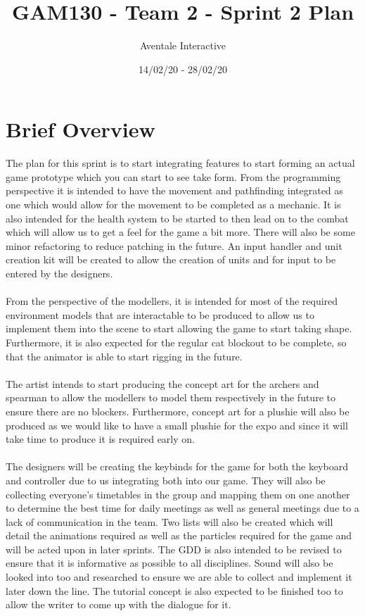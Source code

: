 \documentclass{article}
\title{GAM130 - Team 2 - Sprint 2 Plan}
\author{Aventale Interactive}
\date{14/02/20 - 28/02/20}
\begin{document}
\maketitle

\newpage
\section{Brief Overview}
The plan for this sprint is to start integrating features to start forming an actual game prototype which you can start to see take form. From the programming perspective it is intended to have the movement and pathfinding integrated as one which would allow for the movement to be completed as a mechanic. It is also intended for the health system to be started to then lead on to the combat which will allow us to get a feel for the game a bit more. There will also be some minor refactoring to reduce patching in the future. An input handler and unit creation kit will be created to allow the creation of units and for input to be entered by the designers.
\\\\
From the perspective of the modellers, it is intended for most of the required environment models that are interactable to be produced to allow us to implement them into the scene to start allowing the game to start taking shape. Furthermore, it is also expected for the regular cat blockout to be complete, so that the animator is able to start rigging in the future.
\\\\
The artist intends to start producing the concept art for the archers and spearman to allow the modellers to model them respectively in the future to ensure there are no blockers. Furthermore, concept art for a plushie will also be produced as we would like to have a small plushie for the expo and since it will take time to produce it is required early on.
\\\\
The designers will be creating the keybinds for the game for both the keyboard and controller due to us integrating both into our game. They will also be collecting everyone's timetables in the group and mapping them on one another to determine the best time for daily meetings as well as general meetings due to a lack of communication in the team. Two lists will also be created which will detail the animations required as well as the particles required for the game and will be acted upon in later sprints. The GDD is also intended to be revised to ensure that it is informative as possible to all disciplines. Sound will also be looked into too and researched to ensure we are able to collect and implement it later down the line. The tutorial concept is also expected to be finished too to allow the writer to come up with the dialogue for it.
\end{document}
